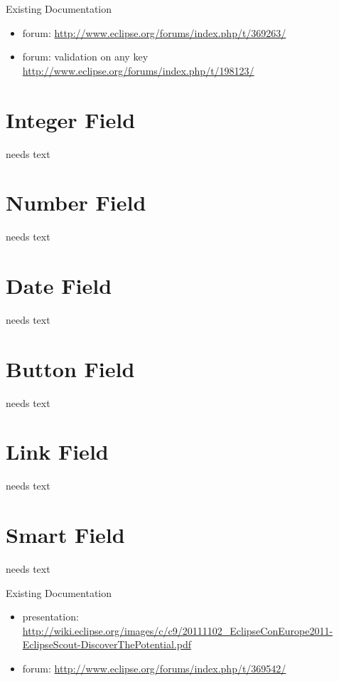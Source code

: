 \documentclass[a4paper,10pt,twoside]{book}
\begin{document}
\noindent Existing Documentation
\begin{itemize}
  \item forum: \url{http://www.eclipse.org/forums/index.php/t/369263/}
  \item forum: validation on any key \url{http://www.eclipse.org/forums/index.php/t/198123/}
\end{itemize}

\section{Integer Field}
needs text
	
\section{Number Field}
needs text
	
\section{Date Field}
needs text

\section{Button Field}
needs text

\section{Link Field}
needs text

\section{Smart Field}
needs text

\noindent Existing Documentation
\begin{itemize}
  \item presentation: \url{http://wiki.eclipse.org/images/c/c9/20111102_EclipseConEurope2011-EclipseScout-DiscoverThePotential.pdf}
  \item forum: \url{http://www.eclipse.org/forums/index.php/t/369542/}
\end{itemize}
\end{document}
